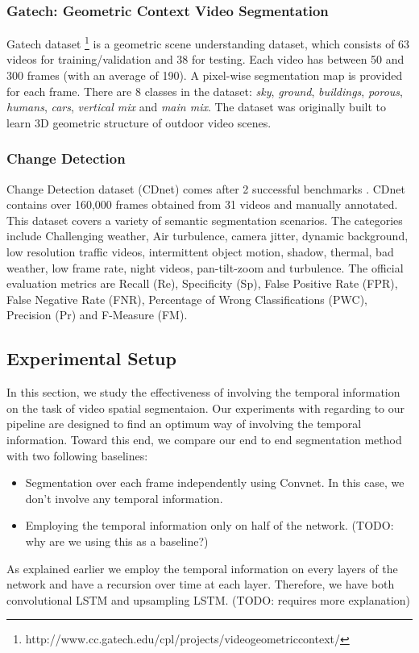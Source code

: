 \subsubsection{Gatech: Geometric Context Video Segmentation}
\label{sssec:gatech}
Gatech dataset
\footnote{http://www.cc.gatech.edu/cpl/projects/videogeometriccontext/}
\cite{VideoGeometricContext2013} is a geometric scene understanding dataset,
which consists of 63 videos for training/validation and 38 for testing. Each
video has between 50 and 300 frames (with an average of 190). A pixel-wise
segmentation map is provided for each frame. There are 8 classes in the
dataset: \textit{sky}, \textit{ground}, \textit{buildings}, \textit{porous},
\textit{humans}, \textit{cars}, \textit{vertical mix} and \textit{main mix}.
The dataset was originally built to learn 3D geometric structure of outdoor
video scenes.


\subsubsection{Change Detection}
\label{sssec:changedet}
Change Detection dataset (CDnet) comes after 2 successful benchmarks
\cite{wang2014cdnet,goyette2012changedetection}. CDnet contains over 160,000
frames obtained from 31 videos and manually annotated. This dataset covers a
variety of semantic segmentation scenarios. The categories include Challenging
weather, Air turbulence, camera jitter, dynamic background, low resolution
traffic videos, intermittent object motion, shadow, thermal, bad weather, low
frame rate, night videos, pan-tilt-zoom and turbulence. The official evaluation
metrics are Recall (Re), Specificity (Sp), False Positive Rate (FPR), False
Negative Rate (FNR), Percentage of Wrong Classifications (PWC), Precision (Pr)
and F-Measure (FM).

\subsection{Experimental Setup}
\label{ssec:setup}
In this section, we study the effectiveness of involving the temporal
information on the task of video spatial segmentaion. Our experiments with
regarding to our pipeline are designed to find an optimum way of involving the
temporal information.
Toward this end, we compare our end to end segmentation method with two
following baselines:
\begin{itemize}
    \item Segmentation over each frame independently using Convnet. In this
        case, we don't involve any temporal information.
    \item Employing the temporal information only on half of the network. (TODO:
        why are we using this as a baseline?)
\end{itemize}
As explained earlier we employ the temporal information on every layers of the
network and have a recursion over time at each layer. Therefore, we have both
convolutional LSTM and upsampling LSTM. (TODO: requires more explanation)
